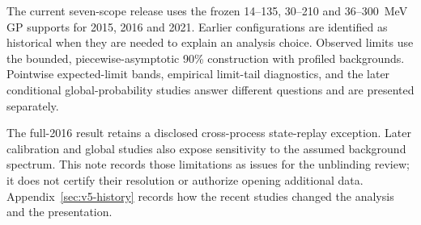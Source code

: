 The current seven-scope release uses the frozen 14--135, 30--210 and 36--300~MeV
GP supports for 2015, 2016 and 2021. Earlier configurations are identified as
historical when they are needed to explain an analysis choice. Observed limits
use the bounded, piecewise-asymptotic 90\% \CLs{} construction with profiled
backgrounds. Pointwise expected-limit bands, empirical limit-tail diagnostics,
and the later conditional global-probability studies answer different questions
and are presented separately.

The full-2016 result retains a disclosed cross-process state-replay exception.
Later calibration and global studies also expose sensitivity to the assumed
background spectrum. This note records those limitations as issues for the
unblinding review; it does not certify their resolution or authorize opening
additional data. Appendix~\ref{sec:v5-history} records how the recent studies
changed the analysis and the presentation.
